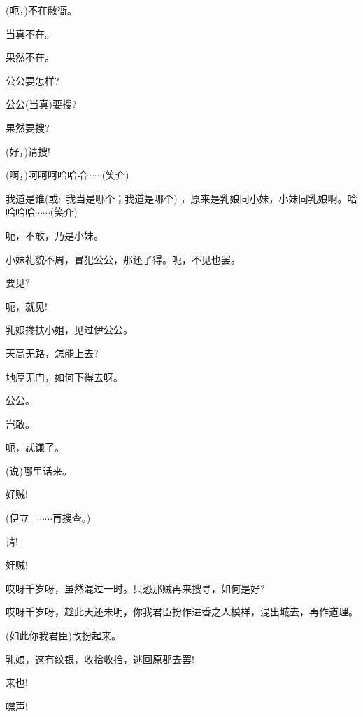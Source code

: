 {(呃，)不在敝衙。

当真不在。

果然不在。

公公要怎样?

公公(当真)要搜?

果然要搜?

(好，)请搜!

(啊，)呵呵呵哈哈哈$\cdots{}\cdots{}$({\hwfs 笑介})

我道是谁({\akai 或}:~我当是哪个；我道是哪个) ，原来是乳娘同小妹，小妹同乳娘啊。哈哈哈哈$\cdots{}\cdots{}$({\hwfs 笑}{\hwfs 介})

呃，不敢，乃是小妹。

小妹礼貌不周，冒犯公公，那还了得。呃，不见也罢。

要见?

呃，就见!

乳娘搀扶小姐，见过伊公公。

天高无路，怎能上去?

地厚无门，如何下得去呀。

公公。

岂敢。

呃，忒谦了。

(说)哪里话来。

好贼!

(伊立\hspace{30pt}~ $\cdots{}\cdots{}$再搜查。)

请!

奸贼!




哎呀千岁呀，虽然混过一时。只恐那贼再来搜寻，如何是好?

哎呀千岁呀，趁此天还未明，你我君臣扮作进香之人模样，混出城去，再作道理。

(如此你我君臣)改扮起来。

乳娘，这有纹银，收拾收拾，逃回原郡去罢!

来也!

噤声!

{\vspace{5pt}}

}
